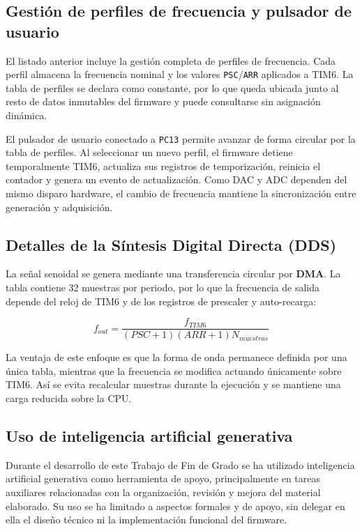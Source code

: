 \documentclass[11pt,a4paper]{article}
\begin{document}
\subsection{Gestión de perfiles de frecuencia y pulsador de usuario}

El listado anterior incluye la gestión completa de perfiles de frecuencia. Cada perfil almacena la frecuencia nominal y los valores \texttt{PSC}/\texttt{ARR} aplicados a TIM6. La tabla de perfiles se declara como constante, por lo que queda ubicada junto al resto de datos inmutables del firmware y puede consultarse sin asignación dinámica.

El pulsador de usuario conectado a \texttt{PC13} permite avanzar de forma circular por la tabla de perfiles. Al seleccionar un nuevo perfil, el firmware detiene temporalmente TIM6, actualiza sus registros de temporización, reinicia el contador y genera un evento de actualización. Como DAC y ADC dependen del mismo disparo hardware, el cambio de frecuencia mantiene la sincronización entre generación y adquisición.


\subsection{Detalles de la Síntesis Digital Directa (DDS)}
La señal senoidal se genera mediante una transferencia circular por \textbf{DMA}\cite{stmanual}. La tabla contiene 32 muestras por periodo, por lo que la frecuencia de salida depende del reloj de TIM6 y de los registros de prescaler y auto-recarga:

\[
f_{out} =
\frac{f_{TIM6}}
{(PSC+1)(ARR+1)N_{muestras}}
\]

La ventaja de este enfoque es que la forma de onda permanece definida por una única tabla, mientras que la frecuencia se modifica actuando únicamente sobre TIM6. Así se evita recalcular muestras durante la ejecución y se mantiene una carga reducida sobre la CPU.

\subsection{Uso de inteligencia artificial generativa}

Durante el desarrollo de este Trabajo de Fin de Grado se ha utilizado inteligencia artificial generativa como herramienta de apoyo, principalmente en tareas auxiliares relacionadas con la organización, revisión y mejora del material elaborado. Su uso se ha limitado a aspectos formales y de apoyo, sin delegar en ella el diseño técnico ni la implementación funcional del firmware.
\end{document}
